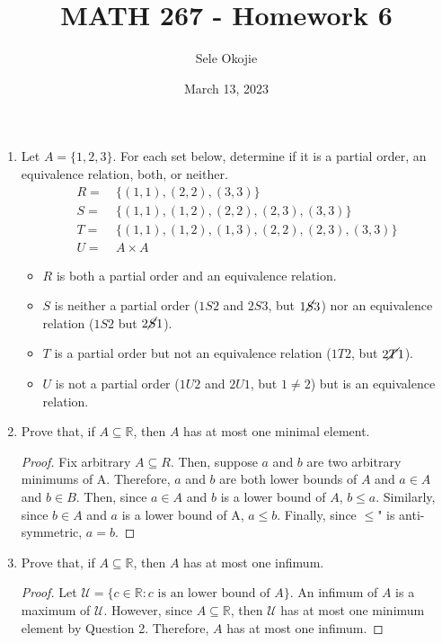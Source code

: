 \documentclass{article}
\title{MATH 267 - Homework 6}
\author{Sele Okojie}
\date{March 13, 2023}
\begin{document}
    \maketitle

    \begin{enumerate}
    
    	\item Let $A = \{ 1, 2, 3 \}$.  For each set below, determine if it is a partial order, an equivalence relation, both, or neither.
    		\begin{align*}
    			R = & \ \{ (1, 1), (2, 2), (3, 3) \} \\
    			S = & \ \{ (1, 1), (1, 2), (2, 2), (2, 3), (3, 3) \} \\
    			T = & \ \{ (1, 1), (1, 2), (1, 3), (2, 2), (2, 3), (3, 3) \} \\
    			U = & \ A \times A
    		\end{align*}

                \begin{itemize}
                    \item $R$ is both a partial order and an equivalence relation.
                    \item $S$ is neither a partial order ($1 S 2$ and $2 S 3$, but $1 \cancel{S} 3$) nor an equivalence relation ($1 S 2$ but $2 \cancel{S} 1$).
                    \item $T$ is a partial order but not an equivalence relation ($1 T 2$, but $2 \cancel{T} 1$).
                    \item $U$ is not a partial order ($1 U 2$ and $2 U 1$, but $1 \neq 2$) but is an equivalence relation.
                \end{itemize}
    	\item Prove that, if $A \subseteq \mathbb{R}$, then $A$ has at most one minimal element.
                \begin{proof}
                    Fix arbitrary $A \subseteq R$. Then, suppose $a$ and $b$ are two arbitrary minimums of A. Therefore, $a$ and $b$ are both lower bounds of $A$ and $a \in A$ and $b \in B$. Then, since $a \in A$ and $b$ is a lower bound of $A$, $b \le a$. Similarly, since $b \in A$ and $a$ is a lower bound of A, $a \le b$. Finally, since \lQuote$\le$" is anti-symmetric, $a = b$. 
                \end{proof}

    	\item Prove that, if $A \subseteq \mathbb{R}$, then $A$ has at most one infimum.
                \begin{proof}
                    Let $\mathcal{U} = \{ c \in \mathbb{R} : c \text{ is an lower bound of }A \}$. An infimum of $A$ is a maximum of $\mathcal{U}$. However, since $A \subseteq \mathbb{R}$, then $\mathcal{U}$ has at most one minimum element by Question 2. Therefore, $A$ has at most one infimum. 
                \end{proof}


\end{enumerate}
\end{document}
